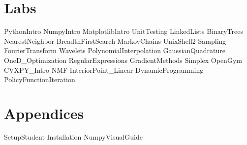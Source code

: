 \documentclass[opener-c,labs,red,nociteref]{HJnewsiambook}
\begin{document}
\part{Labs}
{PythonIntro}
{NumpyIntro}
{MatplotlibIntro}
{UnitTesting}
{LinkedLists}
{BinaryTrees}
{NearestNeighbor}
{BreadthFirstSearch}
{MarkovChains}
{UnixShell2}
{Sampling}
{FourierTransform}
{Wavelets}
{PolynomialInterpolation}
{GaussianQuadrature}
{OneD_Optimization}
{RegularExpressions}
{GradientMethods}
{Simplex}
{OpenGym}
{CVXPY_Intro}
{NMF}
{InteriorPoint_Linear}
{DynamicProgramming}
{PolicyFunctionIteration}

\part{Appendices}
\begin{appendices}
{SetupStudent}
{Installation}
{NumpyVisualGuide}
\end{appendices}



\end{document}
